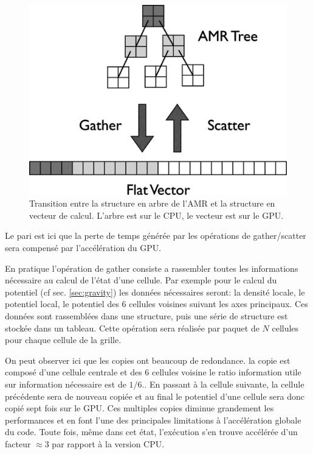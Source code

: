 \begin{figure}
        \includegraphics[width=.95\linewidth]{img/02/gatherscatter.jpg} 
        \caption[Passage AMR / vecteur]{Transition entre la structure en arbre de l'AMR et la structure en vecteur de calcul.
        L'arbre est sur le CPU, le vecteur est sur le GPU.
 		\label{fig:gatherscatter}
 		}
\end{figure}

Le pari est ici que la perte de temps générée par les opérations de gather/scatter sera compensé par l'accélération du GPU.

En pratique l'opération de gather consiste a rassembler toutes les informations nécessaire au calcul de l'état d'une cellule.
Par exemple pour le calcul du potentiel (cf sec. \ref{sec:gravity}) les données nécessaires seront: la densité locale, le potentiel local, le potentiel des 6 cellules voisines suivant les axes principaux.
Ces données sont rassemblées dans une structure, puis une série de structure est stockée dans un tableau.
Cette opération sera réalisée par paquet de $N$ cellules pour chaque cellule de la grille.

On peut observer ici que les copies ont beaucoup de redondance.
la copie est composé d'une cellule centrale et des 6 cellules voisine le ratio information utile sur information nécessaire est de $1/6$..
En passant à la cellule suivante, la cellule précédente sera de nouveau copiée et au final le potentiel d'une cellule sera donc copié sept fois sur le GPU.
Ces multiples copies diminue grandement les performances et en font l'une des principales limitations à l'accélération globale du code.
Toute fois, même dans cet état, l'exécution s'en trouve accélérée d'un facteur $\approx 3$ par rapport à la version CPU.

